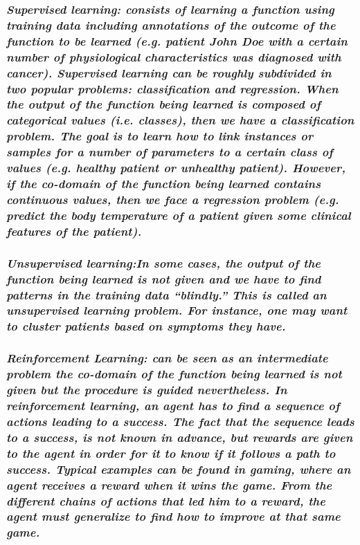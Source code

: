 \subsubsection{\emph{Supervised learning: consists of learning a function using
training data including annotations of the outcome of the function to be learned
(e.g. patient John Doe with a certain number of physiological characteristics
was diagnosed with cancer). Supervised learning can be roughly subdivided in two
popular problems:
\emph{classification} and \emph{regression}. When the output of the function
being learned is composed of categorical values (i.e. classes), then we have a
classification problem. The goal is to learn how to link instances or samples
for a number of parameters to a certain class of values (e.g. healthy patient or
unhealthy patient). However, if the co-domain of the function being learned
contains continuous values, then we face a regression problem (e.g. predict the
body temperature of a patient given some clinical features of the patient).}}

\subsubsection{\emph{Unsupervised learning:In some cases, the output of the
function being learned is not given and we have to find patterns in the training data ``blindly.'' This is called an
\emph{unsupervised} learning problem. For instance, one may want to cluster
patients based on symptoms they have.}}

\subsubsection{\emph{Reinforcement Learning: can be seen as an intermediate
problem the co-domain of the function being learned is not given but the procedure is guided
nevertheless. In reinforcement learning, an agent has to find a sequence of
actions leading to a success. The fact that the sequence leads to a success, is
not known in advance, but rewards are given to the agent in order for it to know
if it follows a path to success. Typical examples can be found in gaming, where
an agent receives a reward when it wins the game. From the different chains of
actions that led him to a reward, the agent must generalize to find how to
improve at that same game.}}